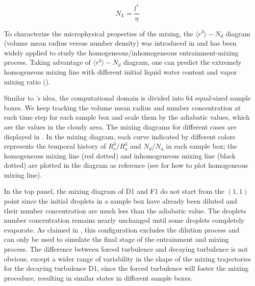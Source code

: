 \documentclass[draft,jgrga]{AGUTeX}
\begin{document}
\begin{article}
\begin{equation}
N_{L}=\frac{l^{*}}{\eta}\label{eq:NL}
\end{equation}

To characterize the microphysical properties of the mixing, the $\langle r^3\rangle -N_d$ diagram (volume mean radius versus number density) was introduced in \cite{Burnet07} and has been widely applied to study the homogeneous/inhomogeneous entrainment-mixing process. Taking advantage of $\langle r^3\rangle -N_d$ diagram, one can predict the extremely homogeneous mixing line with different initial liquid water content and vapor mixing ratio (\cite{Lehmann09,Kumar14}). 

Similar to \cite{Kumar14}'s idea, the computational domain is divided into $64$ equal-sized sample boxes. We keep tracking the volume mean radius and number concentration at each time step for each sample box and scale them by the adiabatic values, which are the values in the cloudy area. The mixing diagrams for different cases are displayed in . In the mixing diagram, each curve indicated by different colors represents the temporal history of $R_v^3/R_a^3$ and $N_d/N_a$ in each sample box; the homogeneous mixing line (red dotted) and inhomogeneous mixing line (black dotted) are plotted in the diagram as reference (see \cite{Burnet07} for how to plot homogeneous mixing line). 

In the top panel, the mixing diagram of D1 and F1 do not start from the $(1,1)$ point since the initial droplets in a sample box have already been diluted and their number concentration are much less than the adiabatic value. The droplets number concentration remains nearly unchanged until some droplets completely evaporate. As claimed in \cite{And04}, this configuration excludes the dilution process and can only be used to simulate the final stage of the entrainment and mixing process. The difference between forced turbulence and decaying turbulence is not obvious, except a wider range of variability in the shape of the mixing trajectories for the decaying turbulence D1, since the forced turbulence will foster the mixing procedure, resulting in similar states in different sample boxes.


\end{article}
\end{document}
